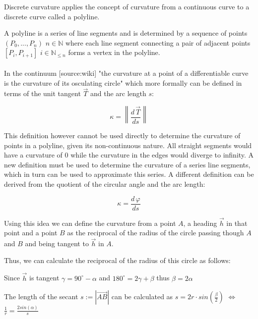 
Discrete curvature applies the concept of curvature from a continuous curve to a discrete curve called a polyline.

\vskip 0.2in

A polyline is a series of line segments and is determined by a sequence of points $(P_0,...,P_n)$ $n \in \mathbb{N}$ where each line segment connecting a pair of adjacent points $[P_i,P_{i+1}]$ $i \in \mathbb{N}_{\le n}$ forms a vertex in the polyline.\\
\\In the continuum [source:wiki] "the curvature at a point of a differentiable curve is the curvature of its osculating circle"  which more formally can be defined in terms of the unit tangent $\vec T$ and the arc length $s$: \citep{CurvatureDefinition}

$$\kappa  = \left\| {\frac{{d\,\vec T}}{{ds}}} \right\|$$

This definition however cannot be used directly to determine the curvature of points in a polyline, given its non-continuous nature. All straight segments would have a curvature of $0$ while the curvature in the edges would diverge to infinity. A new definition must be used to determine the curvature of a series line segments, which in turn can be used to approximate this series. A different definition can be derived from the quotient of the circular angle and the arc length:


$$\kappa  =  {\frac{{d\,\varphi}}{{ds}}}$$

Using this idea we can define the curvature from a point $A$, a heading  $\vec h$ in that point and a point $B$ as the reciprocal of the radius of the circle passing though $A$ and $B$ and being tangent to  $\vec h$ in $A$.

Thus, we can calculate the reciprocal of the radius of this circle as follows:

Since $\vec h$ is tangent $\gamma=90^{\circ} - \alpha$ and $180^{\circ}=2\gamma+\beta$ thus $\beta = 2 \alpha$


The length of the secant $s:=|\vec{AB}|$ can be calculated as
$s = 2r \cdot  sin(\frac{\beta}{2})$
$\Leftrightarrow$
$\frac{1}{r} = \frac{2sin(\alpha)}{s}$

